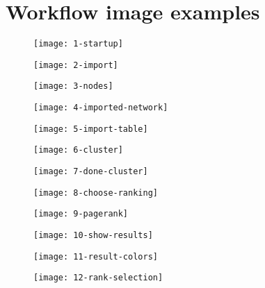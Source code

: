 \section{Workflow image examples}
\begin{figure}[h]
    \texttt{[image: 1-startup]}
\end{figure}
\begin{figure}[h]
    \texttt{[image: 2-import]}
\end{figure}
\begin{figure}[h]
    \texttt{[image: 3-nodes]}
\end{figure}
\begin{figure}[h]
    \texttt{[image: 4-imported-network]}
\end{figure}
\begin{figure}[h]
    \texttt{[image: 5-import-table]}
\end{figure}
\begin{figure}[h]
    \texttt{[image: 6-cluster]}
\end{figure}
\begin{figure}[h]
    \texttt{[image: 7-done-cluster]}
\end{figure}
\begin{figure}[h]
    \texttt{[image: 8-choose-ranking]}
\end{figure}
\begin{figure}[h]
    \texttt{[image: 9-pagerank]}
\end{figure}
\begin{figure}[h]
    \texttt{[image: 10-show-results]}
\end{figure}
\begin{figure}[h]
    \texttt{[image: 11-result-colors]}
\end{figure}
\begin{figure}[h]
    \texttt{[image: 12-rank-selection]}
\end{figure}
